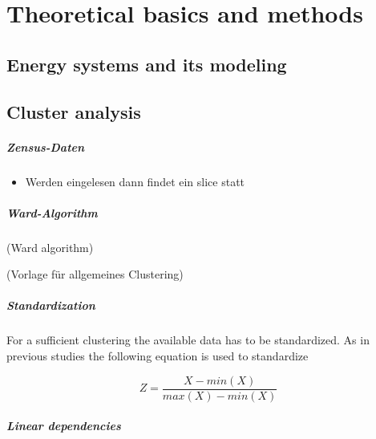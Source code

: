 \chapter{Theoretical basics and methods}

\section{Energy systems and its modeling}








\section{Cluster analysis}

\paragraph{Zensus-Daten}

\begin{itemize}
    \item Werden eingelesen dann findet ein slice statt
\end{itemize}




\paragraph{Ward-Algorithm} 

(Ward algorithm) \cite{Muellner2011}

(Vorlage für allgemeines Clustering) \cite{Jarosch2022} 



\paragraph{Standardization}

For a sufficient clustering the available data has to be standardized. As in previous studies \cite{Weinand2019} the following equation is used to standardize 

\begin{equation}
    Z = \frac{X-min(X)}{max(X)-min(X)}
\end{equation}

\paragraph{Linear dependencies}

